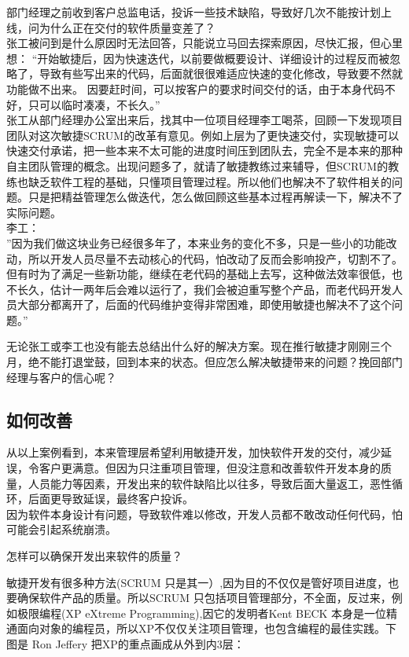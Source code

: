 \documentclass{book}        %
\begin{document}
部门经理之前收到客户总监电话，投诉一些技术缺陷，导致好几次不能按计划上线，问为什么正在交付的软件质量变差了？\\
张工被问到是什么原因时无法回答，只能说立马回去探索原因，尽快汇报，但心里想：
``开始敏捷后，因为快速迭代，以前要做概要设计、详细设计的过程反而被忽略了，导致有些写出来的代码，后面就很很难适应快速的变化修改，导致要不然就功能做不出来。
因要赶时间，可以按客户的要求时间交付的话，由于本身代码不好，只可以临时凑凑，不长久。''\\
张工从部门经理办公室出来后，找其中一位项目经理李工喝茶，回顾一下发现项目团队对这次敏捷SCRUM的改革有意见。例如上层为了更快速交付，实现敏捷可以快速交付承诺，把一些本来不太可能的进度时间压到团队去，完全不是本来的那种自主团队管理的概念。出现问题多了，就请了敏捷教练过来辅导，但SCRUM的教练也缺乏软件工程的基础，只懂项目管理过程。所以他们也解决不了软件相关的问题。只是把精益管理怎么做迭代，怎么做回顾这些基本过程再解读一下，解决不了实际问题。\\
李工：\\
''因为我们做这块业务已经很多年了，本来业务的变化不多，只是一些小的功能改动，所以开发人员尽量不去动核心的代码，怕改动了反而会影响投产，切割不了。但有时为了满足一些新功能，继续在老代码的基础上去写，这种做法效率很低，也不长久，估计一两年后会难以运行了，我们会被迫重写整个产品，而老代码开发人员大部分都离开了，后面的代码维护变得非常困难，即使用敏捷也解决不了这个问题。''

无论张工或李工也没有能去总结出什么好的解决方案。现在推行敏捷才刚刚三个月，绝不能打退堂鼓，回到本来的状态。但应怎么解决敏捷带来的问题？挽回部门经理与客户的信心呢？\\

\hypertarget{ux5982ux4f55ux6539ux5584}{%
\subsection{如何改善}\label{ux5982ux4f55ux6539ux5584}}

从以上案例看到，本来管理层希望利用敏捷开发，加快软件开发的交付，减少延误，令客户更满意。但因为只注重项目管理，但没注意和改善软件开发本身的质量，人员能力等因素，开发出来的软件缺陷比以往多，导致后面大量返工，恶性循环，后面更导致延误，最终客户投诉。\\
因为软件本身设计有问题，导致软件难以修改，开发人员都不敢改动任何代码，怕可能会引起系统崩溃。

怎样可以确保开发出来软件的质量？

敏捷开发有很多种方法(SCRUM
只是其一）,因为目的不仅仅是管好项目进度，也要确保软件产品的质量。所以SCRUM
只包括项目管理部分，不全面，反过来，例如极限编程(XP eXtreme
Programming),因它的发明者Kent BECK
本身是一位精通面向对象的编程员，所以XP不仅仅关注项目管理，也包含编程的最佳实践。下图是
Ron Jeffery 把XP的重点画成从外到内3层：
\end{document}
